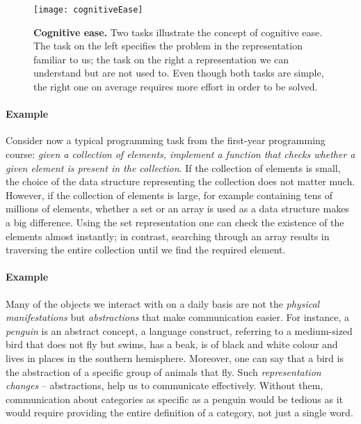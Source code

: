 \begin{figure}
	\centering
	\texttt{[image: cognitiveEase]}
	\caption[Cognitive ease]{\textbf{Cognitive ease.} Two tasks illustrate the concept of cognitive ease. The task on the left specifies the problem in the representation familiar to us; the task on the right a representation we can understand but are not used to. Even though both tasks are simple, the right one on average requires more effort in order to be solved.}
	\label{fig:cogease}
\end{figure}







\paragraph{Example} Consider now a typical programming task from the first-year programming course: \textit{given a collection of elements, implement a function that checks whether a given element is present in the collection}.
If the collection of elements is small, the choice of the data structure representing the collection does not matter much.
However, if the collection of elements is large, for example containing tens of millions of elements, whether a set or an array is used as a data structure makes a big difference.
Using the set representation one can check the existence of the elements almost instantly; in contrast, searching through an array results in traversing the entire collection until we find the required element.



\paragraph{Example}
Many of the objects we interact with on a daily basis are not the \textit{physical manifestations} but \textit{abstractions} that make communication easier.
For instance, a \textit{penguin} is an abstract concept, a language construct, referring to a medium-sized bird that does not fly but swims, has a beak, is of black and white colour and lives in places in the southern hemisphere.
Moreover, one can say that a bird is the abstraction of a specific group of animals that fly.
Such \textit{representation changes} -- abstractions, help us to communicate effectively.
Without them, communication about categories as specific as a penguin would be tedious as it would  require providing the entire definition of a category, not just a single word.




